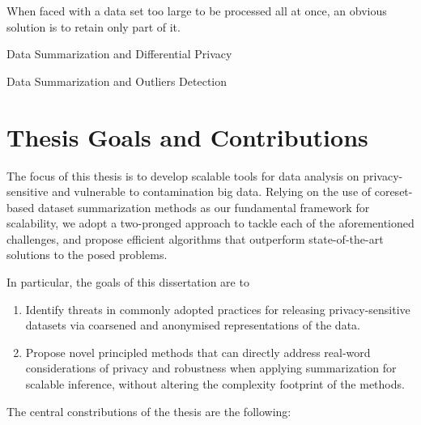 When faced with a data set too large to be processed all at once, an obvious solution is to retain only part of it. 

\par{Data Summarization and Differential Privacy}

\par{Data Summarization and Outliers Detection}

\section{Thesis Goals and Contributions}
\label{sec:thesis-goals}

The focus of this thesis is to develop scalable tools for data analysis on privacy-sensitive and vulnerable to contamination big data. Relying on the use of coreset-based dataset summarization methods as our fundamental framework for scalability, we adopt a two-pronged approach to tackle each of the aforementioned challenges, and propose efficient algorithms that outperform state-of-the-art solutions to the posed problems. 

In particular, the goals of this dissertation are to

\begin{enumerate}
	\item Identify threats in commonly adopted practices for releasing privacy-sensitive datasets via coarsened and anonymised representations of the data.
	\item Propose novel principled methods that can directly address real-word considerations of privacy and robustness when applying summarization for scalable inference, without altering the complexity footprint of the methods.
\end{enumerate}

The central constributions of the thesis are the following:


